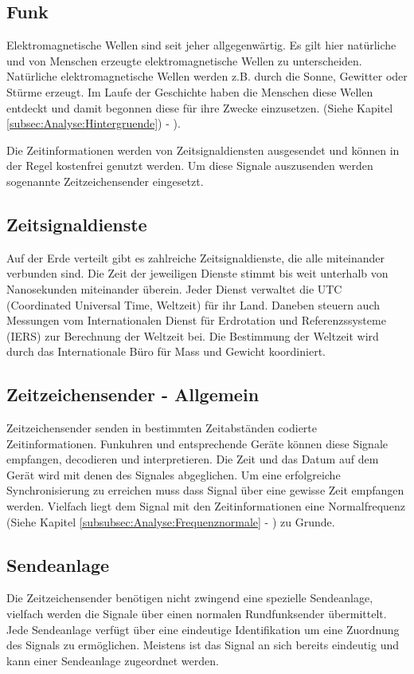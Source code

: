 \subsection{Funk}
Elektromagnetische Wellen sind seit jeher allgegenwärtig. Es gilt hier natürliche und von Menschen erzeugte elektromagnetische Wellen zu unterscheiden. Natürliche elektromagnetische Wellen werden z.B. durch die Sonne, Gewitter oder Stürme erzeugt. Im Laufe der Geschichte haben die Menschen diese Wellen entdeckt und damit begonnen diese für ihre Zwecke einzusetzen. (Siehe Kapitel \ref{subsec:Analyse:Hintergruende}) - ).

Die Zeitinformationen werden von Zeitsignaldiensten ausgesendet und können in der Regel kostenfrei genutzt werden. Um diese Signale auszusenden werden sogenannte Zeitzeichensender eingesetzt. 

\subsection{Zeitsignaldienste}
Auf der Erde verteilt gibt es zahlreiche Zeitsignaldienste, die alle miteinander verbunden sind. Die Zeit der jeweiligen Dienste stimmt bis weit unterhalb von Nanosekunden miteinander überein. Jeder Dienst verwaltet die UTC (Coordinated Universal Time, Weltzeit) für ihr Land. Daneben steuern auch Messungen vom Internationalen Dienst für Erdrotation und Referenzssysteme (IERS) zur Berechnung der Weltzeit bei.
Die Bestimmung der Weltzeit wird durch das Internationale Büro für Mass und Gewicht koordiniert. 

\subsection{Zeitzeichensender - Allgemein}

Zeitzeichensender senden in bestimmten Zeitabständen codierte Zeitinformationen. Funkuhren und entsprechende Geräte können diese Signale empfangen, decodieren und interpretieren. Die Zeit und das Datum auf dem Gerät wird mit denen des Signales abgeglichen. Um eine erfolgreiche Synchronisierung zu erreichen muss dass Signal über eine gewisse Zeit empfangen werden. Vielfach liegt dem Signal mit den Zeitinformationen eine Normalfrequenz (Siehe Kapitel \ref{subsubsec:Analyse:Frequenznormale} - ) zu Grunde.

\subsection{Sendeanlage}
Die Zeitzeichensender benötigen nicht zwingend eine spezielle Sendeanlage, vielfach werden die Signale über einen normalen Rundfunksender übermittelt. Jede Sendeanlage verfügt über eine eindeutige Identifikation um eine Zuordnung des Signals zu ermöglichen. Meistens ist das Signal an sich bereits eindeutig und kann einer Sendeanlage zugeordnet werden.

